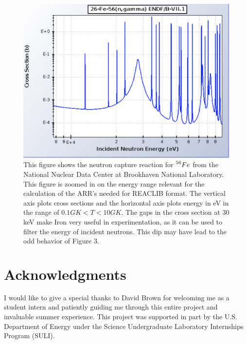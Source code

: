 \documentclass{article}
\begin{document}
\begin{figure}
\includegraphics[width=\linewidth]{cross.png}
  \caption{This figure shows the neutron capture reaction for $\prescript{56}{}{Fe}$ from the National Nuclear Data Center at Brookhaven National Laboratory. This figure is zoomed in on the energy range relevant for the calculation of the ARR's needed for REACLIB format. The vertical axis plots cross sections and the horizontal axis plots energy in eV in the range of $0.1GK<T<10GK$. The gaps in the cross section at 30 keV make Iron very useful in experimentation, as it can be used to filter the energy of incident neutrons. This dip may have lead to the odd behavior of Figure 3.} \label{figure 4}
\end{figure}
\section{Acknowledgments}
I would like to give a special thanks to David Brown for welcoming me as a student intern and patiently guiding me through this entire project and invaluable summer experience. This project was supported in part by the U.S. Department of Energy under the Science Undergraduate Laboratory Internships Program (SULI).
\clearpage

\end{document}
